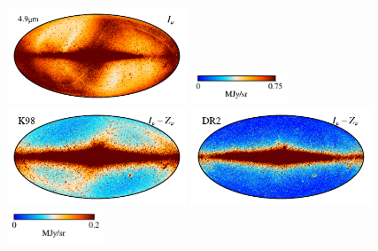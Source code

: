 \documentclass[twocolumn]{aa}
\begin{document}
\begin{figure}
    \includegraphics[height=2.90cm]{figs/compare_zsma/cosmoglobe_ma_04.pdf}%
    \includegraphics[width=2.90cm,angle=90]{figs/compare_zsma/cbar_tot_04.pdf}%
    \includegraphics[height=2.90cm]{figs/compare_zsma/dirbe_zsma_04.pdf}%
    \includegraphics[height=2.90cm]{figs/compare_zsma/cosmoglobe_zsma_04.pdf}%
    \includegraphics[width=2.90cm,angle=90]{figs/compare_zsma/cbar_04.pdf}%
      \\


\end{figure}
\end{document}
